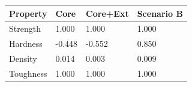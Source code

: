 \begin{tabular}{llll}
\toprule
Property & Core & Core+Ext & Scenario B \\
\midrule
Strength & 1.000 & 1.000 & 1.000 \\
Hardness & -0.448 & -0.552 & 0.850 \\
Density & 0.014 & 0.003 & 0.009 \\
Toughness & 1.000 & 1.000 & 1.000 \\
\bottomrule
\end{tabular}
